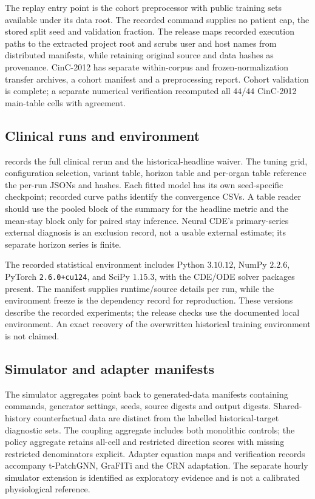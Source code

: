 The replay entry point is the cohort preprocessor with public training sets available under its data root. The recorded command supplies no patient cap, the stored split seed and validation fraction. The release maps recorded execution paths to the extracted project root and scrubs user and host names from distributed manifests, while retaining original source and data hashes as provenance. CinC-2012 has separate within-corpus and frozen-normalization transfer archives, a cohort manifest and a preprocessing report. Cohort validation is complete; a separate numerical verification recomputed all $44/44$ CinC-2012 main-table cells with agreement.

\subsection{Clinical runs and environment}
 records the full clinical rerun and the historical-headline waiver. The tuning grid, configuration selection, variant table, horizon table and per-organ table reference the per-run JSONs and hashes. Each fitted model has its own seed-specific checkpoint; recorded curve paths identify the convergence CSVs. A table reader should use the pooled block of the summary for the headline metric and the mean-stay block only for paired stay inference. Neural CDE's primary-series external diagnosis is an exclusion record, not a usable external estimate; its separate horizon series is finite.

The recorded statistical environment includes Python $3.10.12$, NumPy $2.2.6$, PyTorch \texttt{2.6.0+cu124}, and SciPy $1.15.3$, with the CDE/ODE solver packages present. The manifest supplies runtime/source details per run, while the environment freeze is the dependency record for reproduction. These versions describe the recorded experiments; the release checks use the documented local environment. An exact recovery of the overwritten historical training environment is not claimed.


\subsection{Simulator and adapter manifests}
The simulator aggregates point back to generated-data manifests containing commands, generator settings, seeds, source digests and output digests. Shared-history counterfactual data are distinct from the labelled historical-target diagnostic sets. The coupling aggregate includes both monolithic controls; the policy aggregate retains all-cell and restricted direction scores with missing restricted denominators explicit. Adapter equation maps and verification records accompany t-PatchGNN, GraFITi and the CRN adaptation. The separate hourly simulator extension is identified as exploratory evidence and is not a calibrated physiological reference.
